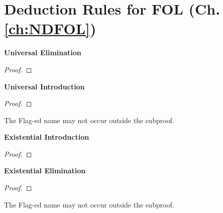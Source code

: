 \newpage

\section*{Deduction Rules for FOL (Ch. \ref{ch:NDFOL})}

\begin{multicols}{2}

\vspace{1em}\noindent\textbf{Universal Elimination}

\begin{proof}
	 
\end{proof}

\vspace{1em}\noindent\textbf{Universal Introduction}

\begin{proof}
	\open
	 \fl{}
	\close
	 
\end{proof}

\noindent The Flag-ed name  may not occur outside the subproof.

\vspace{1em}\noindent\textbf{Existential Introduction}

\begin{proof}
	 
\end{proof}

\vspace{1em}\noindent\textbf{Existential Elimination}


\begin{proof}
	\open
		 
	\close
	 
\end{proof}

\noindent The Flag-ed name  may not occur outside the subproof.

\end{multicols}


